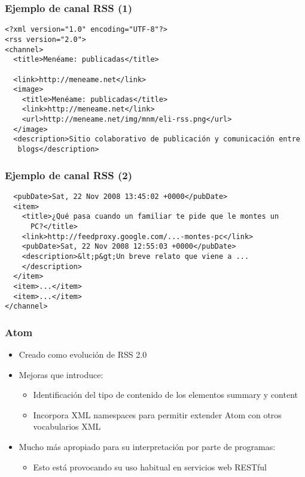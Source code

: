 \begin{frame}[fragile]
\frametitle{Ejemplo de canal RSS (1)}

\begin{verbatim}
<?xml version="1.0" encoding="UTF-8"?>
<rss version="2.0">
<channel>
  <title>Menéame: publicadas</title>
	
  <link>http://meneame.net</link>
  <image>
    <title>Menéame: publicadas</title>
    <link>http://meneame.net</link>
    <url>http://meneame.net/img/mnm/eli-rss.png</url>
  </image>
  <description>Sitio colaborativo de publicación y comunicación entre 
   blogs</description>
\end{verbatim}

\end{frame}


\begin{frame}[fragile]
\frametitle{Ejemplo de canal RSS (2)}

\begin{verbatim}
  <pubDate>Sat, 22 Nov 2008 13:45:02 +0000</pubDate>
  <item>
    <title>¿Qué pasa cuando un familiar te pide que le montes un 
      PC?</title>
    <link>http://feedproxy.google.com/...-montes-pc</link>
    <pubDate>Sat, 22 Nov 2008 12:55:03 +0000</pubDate>
    <description>&lt;p&gt;Un breve relato que viene a ...
    </description>
  </item>
  <item>...</item>
  <item>...</item>
</channel>
\end{verbatim}

\end{frame}


\begin{frame}
\frametitle{Atom}

\begin{itemize}
\item Creado como evolución de RSS 2.0
\item Mejoras que introduce:
  \begin{itemize}
  \item Identificación del tipo de contenido de los elementos summary y content
  \item Incorpora XML namespaces para permitir extender Atom con otros vocabularios XML
  \end{itemize}
\item Mucho más apropiado para su interpretación por parte de programas:
  \begin{itemize}
  \item Esto está provocando su uso habitual en servicios web RESTful
  \end{itemize}
\end{itemize}
\end{frame}

